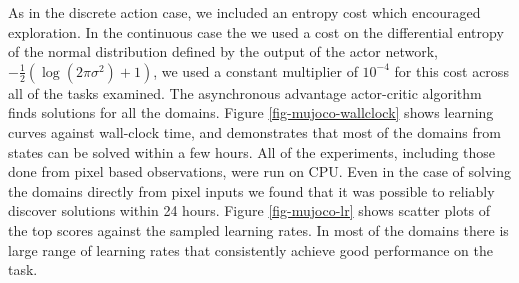 As in the discrete action case, we included an entropy cost which encouraged exploration.
In the continuous case the we used a cost on the differential entropy of the normal distribution defined by
the output of the actor network, $-\frac{1}{2}(\log(2\pi\sigma^2)+1)$, we used a constant multiplier of $10^{-4}$ for this cost across all of the tasks
examined.
%
The asynchronous advantage actor-critic algorithm finds solutions for all the domains.  Figure \ref{fig-mujoco-wallclock}
shows learning curves against wall-clock time, and demonstrates that most of the domains from
states can be solved within a few hours. All of the experiments, including those done
from pixel based observations, were run on CPU.  Even in the case of solving the domains
directly from pixel inputs we found that it was possible to reliably discover solutions
within 24 hours.
Figure \ref{fig-mujoco-lr} shows scatter plots of the top scores against the sampled learning rates.
In most of the domains there is large range of learning rates that consistently achieve good performance
on the task.

%

%
%
%
%
%
%
%
%
%
%
